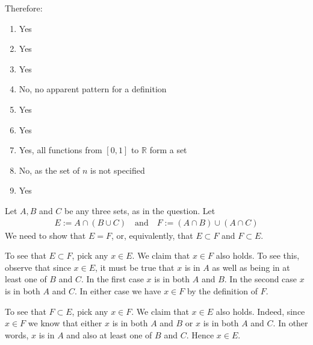 \documentclass[letterpaper,10pt,english]{jupyterBook}
\begin{document}
\sphinxAtStartPar
Therefore:
\begin{enumerate}
%
\item {} 
\sphinxAtStartPar
Yes

\item {} 
\sphinxAtStartPar
Yes

\item {} 
\sphinxAtStartPar
Yes

\item {} 
\sphinxAtStartPar
No, no apparent pattern for a definition

\item {} 
\sphinxAtStartPar
Yes

\item {} 
\sphinxAtStartPar
Yes

\item {} 
\sphinxAtStartPar
Yes, all functions from \([0,1]\) to \(\mathbb{R}\) form a set

\item {} 
\sphinxAtStartPar
No, as the set of \(n\) is not specified

\item {} 
\sphinxAtStartPar
Yes

\end{enumerate}

\sphinxAtStartPar
{}

\sphinxAtStartPar
Let \(A, B\) and \(C\) be any three sets, as in the question.
Let
\begin{equation*}
\begin{split}
E := A \cap (B \cup C)
\quad \text{and} \quad
F := (A \cap B) \cup (A \cap C)
\end{split}
\end{equation*}
\sphinxAtStartPar
We need to show that \(E = F\), or, equivalently, that \(E \subset F\) and \(F
\subset E\).

\sphinxAtStartPar
To see that \(E \subset F\), pick any \(x \in E\). We claim that \(x \in F\) also
holds. To see this, observe that since \(x \in E\), it must be true that \(x\) is
in \(A\) as well as being in at least one of \(B\) and \(C\). In the first case \(x\)
is in both \(A\) and \(B\). In the second case \(x\) is in both \(A\) and \(C\). In
either case we have \(x \in F\) by the definition of \(F\).

\sphinxAtStartPar
To see that \(F \subset E\), pick any \(x \in F\). We claim that \(x
\in E\) also holds. Indeed, since \(x \in F\) we know that either \(x\) is in both
\(A\) and \(B\) or \(x\) is in both \(A\) and \(C\). In other words, \(x\) is in \(A\) and
also at least one of \(B\) and \(C\). Hence \(x \in E\).
\end{document}

